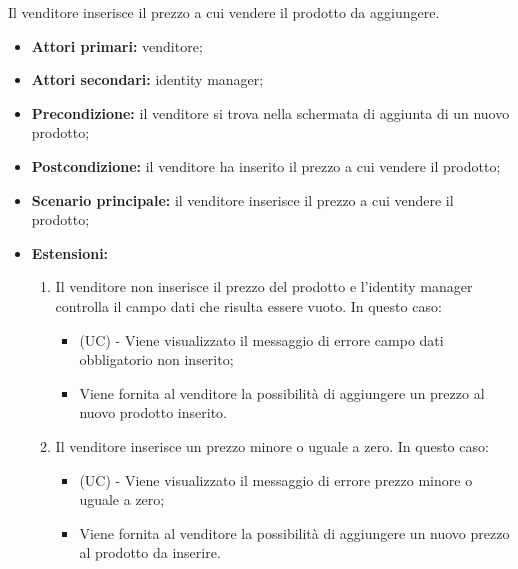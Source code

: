 Il venditore inserisce il prezzo a cui vendere il prodotto da aggiungere.
\begin{itemize}
    \item \textbf{Attori primari:} venditore;
    \item \textbf{Attori secondari:} identity manager;
    \item \textbf{Precondizione:} il venditore si trova nella schermata di aggiunta di un nuovo prodotto;
    \item \textbf{Postcondizione:} il venditore ha inserito il prezzo a cui vendere il prodotto;
    \item \textbf{Scenario principale:} il venditore inserisce il prezzo a cui vendere il prodotto;
    \item \textbf{Estensioni:}
    \begin{enumerate}[label=\lett]
    	\item Il venditore non inserisce il prezzo del prodotto e l'identity manager controlla il campo dati che risulta essere vuoto. In questo caso:
    	\begin{itemize}
    		\item (UC) - Viene visualizzato il messaggio di errore campo dati obbligatorio non inserito;
    		\item Viene fornita al venditore la possibilità di aggiungere un prezzo al nuovo prodotto inserito.
    	\end{itemize}
    	\item Il venditore inserisce un prezzo minore o uguale a zero. In questo caso:
    	\begin{itemize}
    		\item (UC) - Viene visualizzato il messaggio di errore prezzo minore o uguale a zero;
    		\item Viene fornita al venditore la possibilità di aggiungere un nuovo prezzo al prodotto da inserire.
    	\end{itemize}
    \end{enumerate}
\end{itemize}


